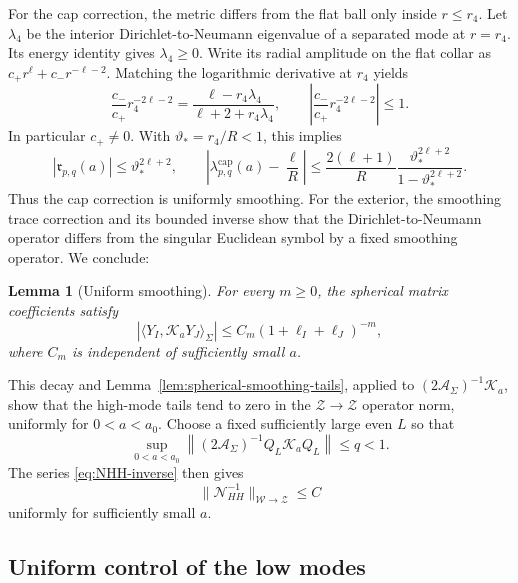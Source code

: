 \documentclass[11pt,a4paper,twoside]{article}
\numberwithin{equation}{section}
\newtheorem{lemma}[theorem]{Lemma}
\theoremstyle{definition}
\theoremstyle{remark}
\begin{document}
For the cap correction, the metric differs from the flat ball only
inside \(r\le r_4\). Let \(\lambda_4\) be the interior
Dirichlet-to-Neumann eigenvalue of a separated mode at \(r=r_4\).
Its energy identity gives \(\lambda_4\ge0\). Write its radial
amplitude on the flat collar as \(c_+r^\ell+c_-r^{-\ell-2}\).
Matching the logarithmic derivative at \(r_4\) yields
\[
\frac{c_-}{c_+}r_4^{-2\ell-2}
=\frac{\ell-r_4\lambda_4}{\ell+2+r_4\lambda_4},
\qquad
\left|\frac{c_-}{c_+}r_4^{-2\ell-2}\right|\le1.
\]
In particular \(c_+\ne0\). With \(\vartheta_*=r_4/R<1\), this
implies
\[
|\mathfrak r_{p,q}(a)|\le\vartheta_*^{2\ell+2},
\qquad
\left|\lambda_{p,q}^{\mathrm{cap}}(a)-\frac\ell R\right|
\le\frac{2(\ell+1)}R
\frac{\vartheta_*^{2\ell+2}}{1-\vartheta_*^{2\ell+2}}.
\]
Thus the cap correction is uniformly smoothing. For the exterior,
the smoothing trace correction and its bounded inverse show that the
Dirichlet-to-Neumann operator differs from the singular Euclidean
symbol by a fixed smoothing operator. We conclude:
\begin{lemma}[Uniform smoothing]
\label{lem:uniform-smoothing-final}
For every \(m\ge0\), the spherical matrix coefficients satisfy
\[
\left|\langle Y_I,\mathcal K_aY_J\rangle_\Sigma\right|
\le C_m(1+\ell_I+\ell_J)^{-m},
\]
where \(C_m\) is independent of sufficiently small \(a\).
\end{lemma}
This decay and Lemma~\ref{lem:spherical-smoothing-tails}, applied to
\((2\mathcal A_\Sigma)^{-1}\mathcal K_a\), show that the high-mode
tails tend to zero in the \(\mathcal Z\to\mathcal Z\) operator
norm, uniformly for \(0<a<a_0\). Choose a fixed sufficiently large even \(L\)
so that
\begin{equation}\label{eq:high-mode-uniform-contraction}
\sup_{0<a<a_0}
\left\|(2\mathcal A_\Sigma)^{-1}Q_L\mathcal K_aQ_L\right\|
\le q<1.
\end{equation}
The series \eqref{eq:NHH-inverse} then gives
\begin{equation}\label{eq:NHH-uniform}
\|\mathcal N_{HH}^{-1}\|_{\mathcal W\to\mathcal Z}\le C
\end{equation}
uniformly for sufficiently small \(a\).

\subsection{Uniform control of the low modes}
\label{subsec:uniform-low-modes}
\end{document}
